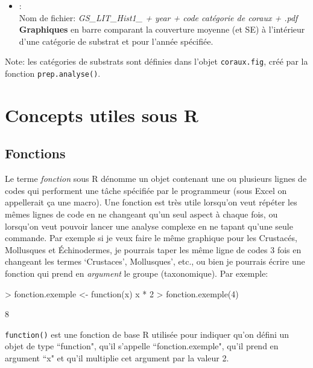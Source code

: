 \documentclass{article}
\begin{document}
\begin{itemize}
\item[] \hypertarget{l5}{}:\\
  Nom de fichier: \emph{GS\_LIT\_Hist1\_ + year + code catégorie de coraux
    + .pdf}\\
  \textbf{Graphiques} en barre comparant la
  couverture moyenne (et SE) à l'intérieur d'une catégorie de substrat
  et pour l'année spécifiée.

\end{itemize}

Note: les catégories de substrats sont définies dans l'objet
\texttt{coraux.fig}, créé par la fonction \texttt{prep.analyse()}.

\section{Concepts utiles sous R}
\subsection*{Fonctions}
Le terme \emph{fonction} sous R dénomme un objet contenant une ou plusieurs
lignes de codes qui performent une tâche spécifiée par le programmeur
(sous Excel on appellerait ça une macro). Une fonction
est très utile lorsqu'on veut répéter les mêmes lignes de code
en ne changeant qu'un seul aspect à chaque fois, ou lorsqu'on veut pouvoir
lancer une analyse complexe en ne tapant qu'une seule commande. Par exemple si je veux
faire le même graphique pour les Crustacés, Mollusques et
Échinodermes, je pourrais taper les même ligne de codes 3 fois en
changeant les termes `Crustaces', Mollusques', etc., ou bien je pourrais
écrire une fonction qui prend en \emph{argument} le groupe (taxonomique).
Par exemple:
\begin{Schunk}
\begin{Sinput}
> fonction.exemple <- function(x) x * 2
> fonction.exemple(4)
\end{Sinput}
\begin{Soutput}
[1] 8
\end{Soutput}
\end{Schunk}
\texttt{function()} est une fonction de base R utilisée pour
indiquer qu'on défini un objet de type ``function", qu'il s'appelle ``fonction.exemple",
qu'il prend en argument ``x" et qu'il multiplie cet argument par la
valeur 2.
\end{document}
